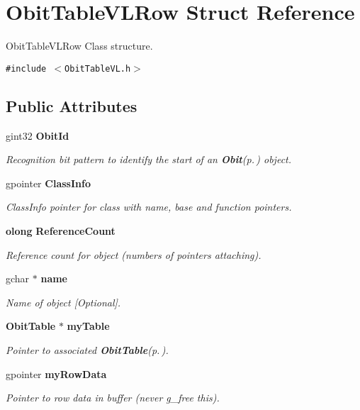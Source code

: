 \section{Obit\-Table\-VLRow Struct Reference}
\label{structObitTableVLRow}
Obit\-Table\-VLRow Class structure.  


{\tt \#include $<$Obit\-Table\-VL.h$>$}

\subsection*{Public Attributes}
\begin{CompactItemize}
\item 
gint32 {\bf Obit\-Id}
\begin{CompactList}\small\item\em Recognition bit pattern to identify the start of an {\bf Obit}{\rm (p.\,\pageref{structObit})} object. \item\end{CompactList}\item 
gpointer {\bf Class\-Info}
\begin{CompactList}\small\item\em Class\-Info pointer for class with name, base and function pointers. \item\end{CompactList}\item 
{\bf olong} {\bf Reference\-Count}
\begin{CompactList}\small\item\em Reference count for object (numbers of pointers attaching). \item\end{CompactList}\item 
gchar $\ast$ {\bf name}
\begin{CompactList}\small\item\em Name of object [Optional]. \item\end{CompactList}\item 
{\bf Obit\-Table} $\ast$ {\bf my\-Table}
\begin{CompactList}\small\item\em Pointer to associated {\bf Obit\-Table}{\rm (p.\,\pageref{structObitTable})}. \item\end{CompactList}\item 
gpointer {\bf my\-Row\-Data}
\begin{CompactList}\small\item\em Pointer to row data in buffer (never g\_\-free this). \item\end{CompactList}\item 

\end{CompactItemize}
